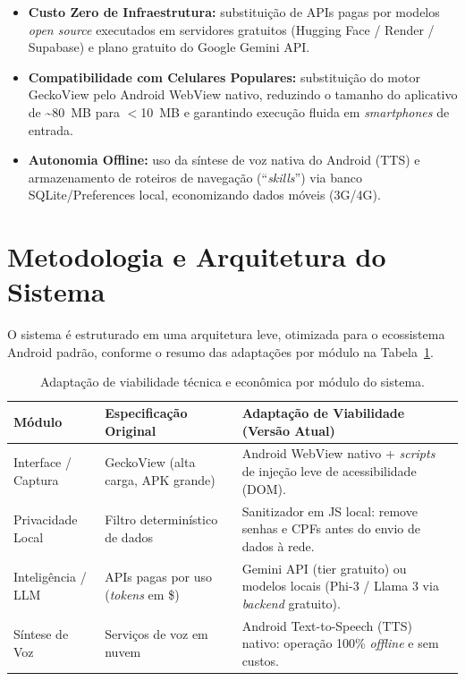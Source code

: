\documentclass[12pt]{article}
\begin{document}
\begin{itemize}
  \item \textbf{Custo Zero de Infraestrutura:} substituição de APIs pagas por modelos \emph{open source} executados em servidores gratuitos (Hugging Face / Render / Supabase) e plano gratuito do Google Gemini API.
  \item \textbf{Compatibilidade com Celulares Populares:} substituição do motor GeckoView pelo Android WebView nativo, reduzindo o tamanho do aplicativo de \textasciitilde 80~MB para $<$10~MB e garantindo execução fluida em \emph{smartphones} de entrada.
  \item \textbf{Autonomia Offline:} uso da síntese de voz nativa do Android (TTS) e armazenamento de roteiros de navegação (``\emph{skills}'') via banco SQLite/Preferences local, economizando dados móveis (3G/4G).
\end{itemize}

\section{Metodologia e Arquitetura do Sistema}

O sistema é estruturado em uma arquitetura leve, otimizada para o ecossistema Android padrão, conforme o resumo das adaptações por módulo na Tabela~\ref{tab:viabilidade}.

\begin{table}[!ht]
  \centering
  \caption{Adaptação de viabilidade técnica e econômica por módulo do sistema.}
  \label{tab:viabilidade}
  \begin{tabular}{|p{3.0cm}|p{4.6cm}|p{5.8cm}|}
    \hline
    \textbf{Módulo} & \textbf{Especificação Original} & \textbf{Adaptação de Viabilidade (Versão Atual)} \\ \hline
    Interface / Captura & GeckoView (alta carga, APK grande) & Android WebView nativo + \emph{scripts} de injeção leve de acessibilidade (DOM). \\ \hline
    Privacidade Local & Filtro determinístico de dados & Sanitizador em JS local: remove senhas e CPFs antes do envio de dados à rede. \\ \hline
    Inteligência / LLM & APIs pagas por uso (\emph{tokens} em \$) & Gemini API (tier gratuito) ou modelos locais (Phi-3 / Llama 3 via \emph{backend} gratuito). \\ \hline
    Síntese de Voz & Serviços de voz em nuvem & Android Text-to-Speech (TTS) nativo: operação 100\% \emph{offline} e sem custos. \\ \hline
  \end{tabular}
\end{table}
\end{document}
